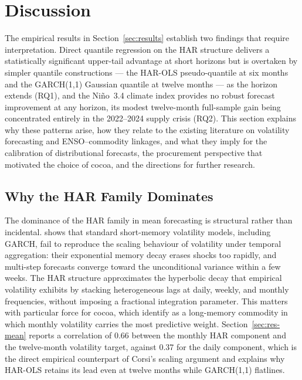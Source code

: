 \section{Discussion}
\label{sec:discussion}

The empirical results in Section~\ref{sec:results} establish two findings that
require interpretation. Direct quantile regression on the HAR structure
delivers a statistically significant upper-tail advantage at short horizons
but is overtaken by simpler quantile constructions --- the HAR-OLS
pseudo-quantile at six months and the GARCH(1,1) Gaussian quantile at twelve
months --- as the horizon extends (RQ1), and the Ni\~no~3.4 climate index
provides no robust forecast improvement at any horizon, its modest
twelve-month full-sample gain being concentrated entirely in the 2022--2024
supply crisis (RQ2). This section
explains why these patterns arise, how they relate to the existing literature
on volatility forecasting and ENSO--commodity linkages, and what they imply for
the calibration of distributional forecasts, the procurement perspective that
motivated the choice of cocoa, and the directions for further research.

\subsection{Why the HAR Family Dominates}
\label{sec:disc-rq1}

The dominance of the HAR family in mean forecasting is structural rather
than incidental. \textcite{corsiSimpleApproximateLongMemory2008}
shows that standard short-memory volatility models, including GARCH, fail to
reproduce the scaling behaviour of volatility under temporal aggregation: their
exponential memory decay erases shocks too rapidly, and multi-step forecasts
converge toward the unconditional variance within a few weeks. The HAR
structure approximates the hyperbolic decay that empirical volatility
exhibits by stacking heterogeneous lags at daily, weekly, and monthly
frequencies, without imposing a fractional integration parameter. This
matters with particular force for cocoa, which
\textcite{alfeusForecastingVolatilityCommodity2022} identify as a long-memory
commodity in which monthly volatility carries the most predictive weight.
Section~\ref{sec:res-mean} reports a correlation of 0.66 between the monthly
HAR component and the twelve-month volatility target, against 0.37 for the
daily component, which is the direct empirical counterpart of Corsi's scaling
argument and explains why HAR-OLS retains its lead even at twelve months while
GARCH(1,1) flatlines.

